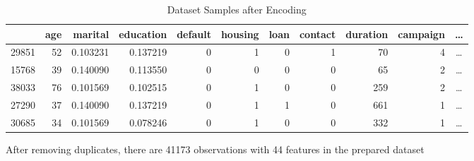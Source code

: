\documentclass[11pt,a4paper]{article}
\begin{document}



    \begin{table}[ht]
        \centering
        \begin{tabular}{lrrrrrrrrrc}
            {} &  age &   marital &  education &  default &  housing &  loan &  contact &  duration &  campaign & \dots \\
            \hline \hline
            29851 &   52 &  0.103231 &   0.137219 &        0 &        1 &     0 &        1 &        70 &         4 & \dots \\
            15768 &   39 &  0.140090 &   0.113550 &        0 &        0 &     0 &        0 &        65 &         2 & \dots \\
            38033 &   76 &  0.101569 &   0.102515 &        0 &        1 &     0 &        0 &       259 &         2 & \dots \\
            27290 &   37 &  0.140090 &   0.137219 &        0 &        1 &     1 &        0 &       661 &         1 & \dots \\
            30685 &   34 &  0.101569 &   0.078246 &        0 &        1 &     0 &        0 &       332 &         1 & \dots \\
        \end{tabular}
        \caption{Dataset Samples after Encoding}
        \label{tab:samples_encoded}
    \end{table}
    
    \noindent
    After removing duplicates, there are 41173 observations with 44 features in the prepared dataset
    
    
\end{document}
